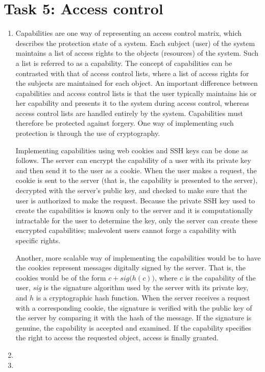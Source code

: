 \section*{Task 5: Access control}
\begin{enumerate}
\item %
  Capabilities are one way of representing an access control matrix, which describes the protection state of a system. Each subject (user) of the system maintains a list of access rights to the objects (resources) of the system. Such a list is referred to as a capability. The concept of capabilities can be contrasted with that of access control lists, where a list of access rights for the subjects are maintained for each object. An important difference between capabilities and access control lists is that the user typically maintains his or her capability and presents it to the system during access control, whereas access control lists are handled entirely by the system. Capabilities must therefore be protected against forgery. One way of implementing such protection is through the use of cryptography.\cite{bishop02}

Implementing capabilities using web cookies and SSH keys can be done as follows. The server can encrypt the capability of a user with its private key and then send it to the user as a cookie. When the user makes a request, the cookie is sent to the server (that is, the capability is presented to the server), decrypted with the server's public key, and checked to make sure that the user is authorized to make the request. Because the private SSH key used to create the capabilities is known only to the server and it is computationally intractable for the user to determine the key, only the server can create these encrypted capabilities; malevolent users cannot forge a capability with specific rights.

Another, more scalable way of implementing the capabilities would be to have the cookies represent messages digitally signed by the server. That is, the cookies would be of the form $c + \textit{sig}\big(h(c)\big)$, where $c$ is the capability of the user, \textit{sig} is the signature algorithm used by the server with its private key, and $h$ is a cryptographic hash function. When the server receives a request with a corresponding cookie, the signature is verified with the public key of the server by comparing it with the hash of the message. If the signature is genuine, the capability is accepted and examined. If the capability specifies the right to access the requested object, access is finally granted.
\item %
\item \highergradesonly
\end{enumerate}
